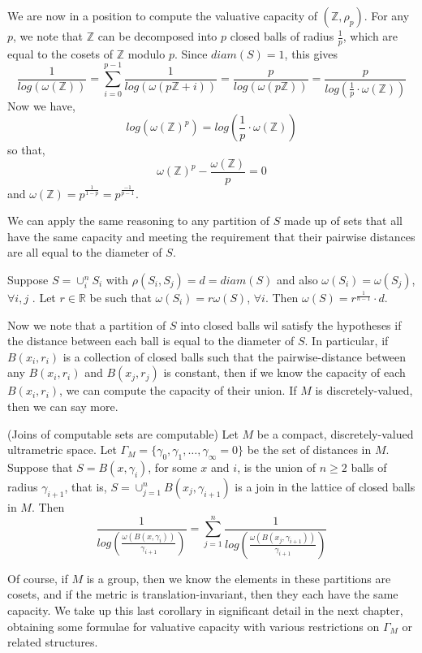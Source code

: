 \begin{example}
We are now in a position to compute the valuative capacity of $(\mathbb{Z}, \rho_p)$. For any $p$, we note that $\mathbb{Z}$ can be decomposed into $p$ closed balls of radius $\frac{1}{p}$, which are equal to the cosets of $\mathbb{Z}$ modulo $p$. Since $diam(S)=1$, this gives 
\[\frac{1}{log(\omega(\mathbb{Z}))} = \sum_{i=0}^{p-1} \frac{1}{log(\omega(p\mathbb{Z} +i))} = \frac{p}{log(\omega(p\mathbb{Z}))} = \frac{p}{log(\frac{1}{p} \cdot \omega(\mathbb{Z}))}\]
Now we have,
\[log(\omega(\mathbb{Z})^p) = log(\frac{1}{p} \cdot\omega(\mathbb{Z}))\]
so that,
\[\omega(\mathbb{Z})^p - \frac{\omega(\mathbb{Z})}{p} = 0 \]
and $\omega(\mathbb{Z})= p^{\frac{1}{1-p}}=p^{\frac{-1}{p-1}}$.
\end{example}

We can apply the same reasoning to any partition of $S$ made up of sets that all have the same capacity and meeting the requirement that their pairwise distances are all equal to the diameter of $S$.\\

\begin{corollary}
\label{semiregular}
	Suppose $S = \cup_i^n S_i$ with $\rho(S_i, S_j)=d=diam(S)$ and also $\omega(S_i)=\omega(S_j)$, $\forall i,j$ .  Let $r \in \mathbb{R}$ be such that $\omega(S_i)=r\omega(S)$, $\forall i$. Then $\omega(S) = r^{\frac{1}{n-1}}\cdot d$. 
\end{corollary}

Now we note that a partition of $S$ into closed balls wil satisfy the hypotheses if the distance between each ball is equal to the diameter of $S$. In particular, if $B(x_i,r_i)$ is a collection of closed balls such that the pairwise-distance between any $B(x_i,r_i)$ and $B(x_j,r_j)$ is constant, then if we know the capacity of each $B(x_i,r_i)$, we can compute the capacity of their union. If $M$ is discretely-valued, then we can say more.\\ 
\begin{corollary}
	(Joins of computable sets are computable) Let $M$ be a compact, discretely-valued ultrametric space. Let $\Gamma_M = \{\gamma_0, \gamma_1,\ldots, \gamma_\infty=0\}$ be the set of distances in $M$. Suppose that $S = B(x, \gamma_i)$,  for some $x$ and $i$, is the union of $n \geq 2$ balls of radius $\gamma_{i+1}$, that is, $S=\cup_{j=1}^n B(x_j, \gamma_{i+1})$ is a join in the lattice of closed balls in $M$. Then 
	\[\frac{1}{log(\frac{\omega(B(x, \gamma_i))}{\gamma_{i+1}} )} = \sum_{j=1}^n \frac{1}{log(\frac{\omega(B(x_j, \gamma_{i+1}))}{\gamma_{i+1} })}\]
\end{corollary}

Of course, if $M$ is a group, then we know the elements in these partitions are cosets, and if the metric is translation-invariant, then they each have the same capacity. We take up this last corollary in significant detail in the next chapter, obtaining some formulae for valuative capacity with various restrictions on $\Gamma_M$ or related structures.